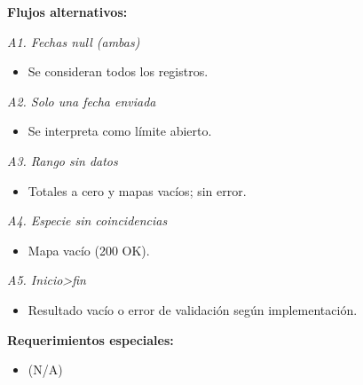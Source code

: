 \vspace{0.5em}
\noindent\textbf{Flujos alternativos:}

\vspace{0.3em}
\noindent\textit{A1. Fechas null (ambas)}
\begin{itemize}[nosep]
   \item Se consideran todos los registros.
\end{itemize}

\vspace{0.3em}
\noindent\textit{A2. Solo una fecha enviada}
\begin{itemize}[nosep]
   \item Se interpreta como límite abierto.
\end{itemize}

\vspace{0.3em}
\noindent\textit{A3. Rango sin datos}
\begin{itemize}[nosep]
   \item Totales a cero y mapas vacíos; sin error.
\end{itemize}

\vspace{0.3em}
\noindent\textit{A4. Especie sin coincidencias}
\begin{itemize}[nosep]
   \item Mapa vacío (200 OK).
\end{itemize}

\vspace{0.3em}
\noindent\textit{A5. Inicio>fin}
\begin{itemize}[nosep]
   \item Resultado vacío o error de validación según implementación.
\end{itemize}

\vspace{0.5em}
\noindent\textbf{Requerimientos especiales:}
\begin{itemize}[nosep]
   \item (N/A)
\end{itemize}

